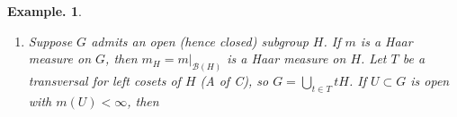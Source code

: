 \documentclass[11pt, a4paper]{memoir}
\DeclareMathOperator{\R}{{\mathbb{R}}}
\DeclareMathOperator{\C}{{\mathbb{C}}}
\theoremstyle{change}
\theoremstyle{plain}
\theoremstyle{nonumberplain}
\newtheorem{example}{Example.}
\DeclareMathOperator{\GL}{GL}
\numberwithin{equation}{section}
\begin{document}
\begin{example}
\begin{enumerate}[nl,r]
\begin{enumerate}[nl,a]
                    Then for $x\in\GL_n(\R)$, we have
                    \begin{align*}
                        I(f\cdot x)&=\int_{\GL_n(\R)}f(xy)\frac{1}{|\det xy|^n}\cdot|\det x|^ndy\\
                                   &=\int_{\GL_n(\R)}f(y)\frac{1}{|\det y|^n}\cdot\frac{|\det x|^n}{|\det x|^n}dy=I(f)
                    \end{align*}
                    If $M_{\GL_n(\R)}$ is the measure associated with $I$, then with $m$ the Lebesgue measure on $M_n(\R)\cong\R^{n^2}$, we have
                    \begin{equation*}
                        \frac{dm_{\GL_n(\R)}}{dm}(y)=\frac{1}{|\det y|^n}
                    \end{equation*}
                \item If we take $\R^\times\cong\GL_1(\R)$, then
                    \begin{equation*}
                        I(f)=\int_{\R^\times}f(y)\frac{dy}{|y|}
                    \end{equation*}
                \item Consider $\C^\times=\C\setminus\{0\}\subseteq\C\cong\R^2$.
                    Then $[L_{x+iy}]_{(1,i)}=\begin{pmatrix}x&-y\\y&x\end{pmatrix}$ so that $\det L_{x+iy}=|x+iy|^2$.
                    Thus we get an integral on $G=\C^\times$ by
                    \begin{equation*}
                        I(f)=\int_{\C^\times}f(z)\frac{dz}{|z|^2}
                    \end{equation*}
                \item On $\GL_n(\C)\subset\GL_{2n}(\R)$, we likewise find Haar integral
                    \begin{equation*}
                        I(f)=\int_{\GL_n(\C)}f(y)\frac{1}{|\det y|^{2n}}dy.
                    \end{equation*}
            \end{enumerate}
        \item Suppose $G$ admits an open (hence closed) subgroup $H$.
            If $m$ is a Haar measure on $G$, then $m_H=m|_{\mathcal{B}(H)}$ is a Haar measure on $H$.
            Let $T$ be a transversal for left cosets of $H$ (A of C), so $G=\bigcup_{t\in T}tH$.
            If $U\subset G$ is open with $m(U)<\infty$, then
            \begin{align*}

\end{align*}
\end{enumerate}
\end{example}
\end{document}
